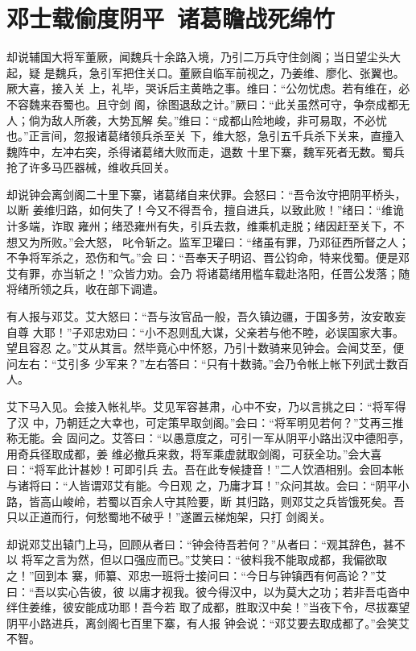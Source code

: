 \chapter{邓士载偷度阴平~诸葛瞻战死绵竹}

却说辅国大将军董厥，闻魏兵十余路入境，乃引二万兵守住剑阁；当日望尘头大起，疑
是魏兵，急引军把住关口。董厥自临军前视之，乃姜维、廖化、张翼也。厥大喜，接入关
上，礼毕，哭诉后主黄皓之事。维曰：“公勿忧虑。若有维在，必不容魏来吞蜀也。且守剑
阁，徐图退敌之计。”厥曰：“此关虽然可守，争奈成都无人；倘为敌人所袭，大势瓦解
矣。”维曰：“成都山险地峻，非可易取，不必忧也。”正言间，忽报诸葛绪领兵杀至关
下，维大怒，急引五千兵杀下关来，直撞入魏阵中，左冲右突，杀得诸葛绪大败而走，退数
十里下寨，魏军死者无数。蜀兵抢了许多马匹器械，维收兵回关。

却说钟会离剑阁二十里下寨，诸葛绪自来伏罪。会怒曰：“吾令汝守把阴平桥头，以断
姜维归路，如何失了！今又不得吾令，擅自进兵，以致此败！”绪曰：“维诡计多端，诈取
雍州；绪恐雍州有失，引兵去救，维乘机走脱；绪因赶至关下，不想又为所败。”会大怒，
叱令斩之。监军卫瓘曰：“绪虽有罪，乃邓征西所督之人；不争将军杀之，恐伤和气。”会
曰：“吾奉天子明诏、晋公钧命，特来伐蜀。便是邓艾有罪，亦当斩之！”众皆力劝。会乃
将诸葛绪用槛车载赴洛阳，任晋公发落；随将绪所领之兵，收在部下调遣。

有人报与邓艾。艾大怒曰：“吾与汝官品一般，吾久镇边疆，于国多劳，汝安敢妄自尊
大耶！”子邓忠劝曰：“小不忍则乱大谋，父亲若与他不睦，必误国家大事。望且容忍
之。”艾从其言。然毕竟心中怀怒，乃引十数骑来见钟会。会闻艾至，便问左右：“艾引多
少军来？”左右答曰：“只有十数骑。”会乃令帐上帐下列武士数百人。

艾下马入见。会接入帐礼毕。艾见军容甚肃，心中不安，乃以言挑之曰：“将军得了汉
中，乃朝廷之大幸也，可定策早取剑阁。”会曰：“将军明见若何？”艾再三推称无能。会
固问之。艾答曰：“以愚意度之，可引一军从阴平小路出汉中德阳亭，用奇兵径取成都，姜
维必撤兵来救，将军乘虚就取剑阁，可获全功。”会大喜曰：“将军此计甚妙！可即引兵
去。吾在此专候捷音！”二人饮酒相别。会回本帐与诸将曰：“人皆谓邓艾有能。今日观
之，乃庸才耳！”众问其故。会曰：“阴平小路，皆高山峻岭，若蜀以百余人守其险要，断
其归路，则邓艾之兵皆饿死矣。吾只以正道而行，何愁蜀地不破乎！”遂置云梯炮架，只打
剑阁关。

却说邓艾出辕门上马，回顾从者曰：“钟会待吾若何？”从者曰：“观其辞色，甚不以
将军之言为然，但以口强应而已。”艾笑曰：“彼料我不能取成都，我偏欲取之！”回到本
寨，师纂、邓忠一班将士接问曰：“今日与钟镇西有何高论？”艾曰：“吾以实心告彼，彼
以庸才视我。彼今得汉中，以为莫大之功；若非吾屯沓中绊住姜维，彼安能成功耶！吾今若
取了成都，胜取汉中矣！”当夜下令，尽拔寨望阴平小路进兵，离剑阁七百里下寨，有人报
钟会说：“邓艾要去取成都了。”会笑艾不智。

